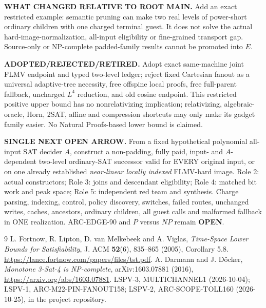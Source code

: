 \documentclass[11pt]{article}
\newcommand{\OPEN}{\textbf{OPEN}}
\begin{document}
\noindent\textbf{WHAT CHANGED RELATIVE TO ROOT MAIN.} Add an exact restricted example: semantic pruning can make two real levels of power-short ordinary children with one charged terminal guest. It does not solve the actual hard-image-normalization, all-input eligibility or fine-grained transport gap. Source-only or NP-complete padded-family results cannot be promoted into $E$.

\noindent\textbf{ADOPTED/REJECTED/RETIRED.} Adopt exact same-machine joint FLMV endpoint and typed two-level ledger; reject fixed Cartesian fanout as a universal adaptive-tree necessity, free offspine local proofs, free full-parent fallback, uncharged $L^4$ reduction, and old cosine endpoint. This restricted positive upper bound has no nonrelativizing implication; relativizing, algebraic-oracle, Horn, 2SAT, affine and compression shortcuts may only make its gadget family easier. No Natural Proofs-based lower bound is claimed.

\noindent\textbf{SINGLE NEXT OPEN ARROW.} From a fixed hypothetical polynomial all-input SAT decider $A$, construct a non-padding, fully paid, input- and $A$-dependent two-level ordinary-SAT successor valid for EVERY original input, or on one already established \emph{near-linear locally indexed} FLMV-hard image. Role 2: actual constructors; Role 3: joins and descendant eligibility; Role 4: matched bit work and peak space; Role 5: independent red team and synthesis. Charge parsing, indexing, control, policy discovery, switches, failed routes, unchanged writes, caches, ancestors, ordinary children, all guest calls and malformed fallback in ONE realization. ARC-EDGE-90 and $P$ versus $NP$ remain \OPEN.

\begin{thebibliography}{9}\small
{} L. Fortnow, R. Lipton, D. van Melkebeek and A. Viglas, \emph{Time-Space Lower Bounds for Satisfiability}, J. ACM \textbf{52}(6), 835--865 (2005), Corollary 5.8. \url{https://lance.fortnow.com/papers/files/tst.pdf}.
 A. Darmann and J. D\"ocker, \emph{Monotone 3-Sat-4 is NP-complete}, arXiv:1603.07881 (2016), \url{https://arxiv.org/abs/1603.07881}.
 LSPV-3, MULTICHANNEL1 (2026-10-04); LSPV-1, ARC-M22-PIN-FANOUT158; LSPV-2, ARC-SCOPE-TOLL160 (2026-10-25), in the project repository.
\end{thebibliography}
\end{document}
